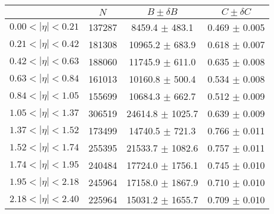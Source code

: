 \begin{tabular}{lccc}
\hline
    &   $N$   & $B \pm \delta B$  &  $C \pm \delta C$ \\
\hline
$0.00 < |\eta| <0.21$          & 137287     & 8459.4     $\pm$ 483.1 & 0.469      $\pm$ 0.005 \\
$0.21 < |\eta| <0.42$          & 181308     & 10965.2    $\pm$ 683.9 & 0.618      $\pm$ 0.007 \\
$0.42 < |\eta| <0.63$          & 188060     & 11745.9    $\pm$ 611.0 & 0.635      $\pm$ 0.008 \\
$0.63 < |\eta| <0.84$          & 161013     & 10160.8    $\pm$ 500.4 & 0.534      $\pm$ 0.008 \\
$0.84 < |\eta| <1.05$          & 155699     & 10684.3    $\pm$ 662.7 & 0.512      $\pm$ 0.009 \\
$1.05 < |\eta| <1.37$          & 306519     & 24614.8    $\pm$ 1025.7 & 0.639      $\pm$ 0.009 \\
$1.37 < |\eta| <1.52$          & 173499     & 14740.5    $\pm$ 721.3 & 0.766      $\pm$ 0.011 \\
$1.52 < |\eta| <1.74$          & 255395     & 21533.7    $\pm$ 1082.6 & 0.757      $\pm$ 0.011 \\
$1.74 < |\eta| <1.95$          & 240484     & 17724.0    $\pm$ 1756.1 & 0.745      $\pm$ 0.010 \\
$1.95 < |\eta| <2.18$          & 245964     & 17158.0    $\pm$ 1867.9 & 0.710      $\pm$ 0.010 \\
$2.18 < |\eta| <2.40$          & 225964     & 15031.2    $\pm$ 1655.7 & 0.709      $\pm$ 0.010 \\
\hline
\end{tabular}
